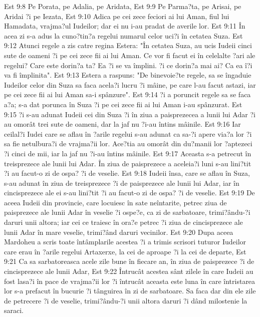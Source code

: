 Est 9:8  Pe Porata, pe Adalia, pe Aridata,
Est 9:9  Pe Parma?ta, pe Arisai, pe Aridai ?i pe Iezata,
Est 9:10  Adica pe cei zece feciori ai lui Aman, fiul lui Hamadata, vrajma?ul Iudeilor; dar ei nu i-au pradat de averile lor.
Est 9:11  În acea zi s-a adus la cuno?tin?a regelui numarul celor uci?i în cetatea Suza.
Est 9:12  Atunci regele a zis catre regina Estera: "În cetatea Suza, au ucis Iudeii cinci sute de oameni ?i pe cei zece fii ai lui Aman. Ce vor fi facut ei în celelalte ?ari ale regelui? Care este dorin?a ta? Ea ?i se va împlini. ?i ce dorin?a mai ai? Ca ea î?i va fi împlinita".
Est 9:13  Estera a raspuns: "De binevoie?te regele, sa se îngaduie Iudeilor celor din Suza sa faca acela?i lucru ?i mâine, pe care l-au facut astazi, iar pe cei zece fii ai lui Aman sa-i spânzure".
Est 9:14  ?i a poruncit regele sa se faca a?a; s-a dat porunca în Suza ?i pe cei zece fii ai lui Aman i-au spânzurat.
Est 9:15  ?i s-au adunat Iudeii cei din Suza ?i în ziua a paisprezecea a lunii lui Adar ?i au omorât trei sute de oameni, dar la jaf nu ?i-au întins mâinile.
Est 9:16  Iar ceilal?i Iudei care se aflau în ?arile regelui s-au adunat ca sa-?i apere via?a lor ?i sa fie netulbura?i de vrajma?ii lor. Ace?tia au omorât din du?manii lor ?aptezeci ?i cinci de mii, iar la jaf nu ?i-au întins mâinile.
Est 9:17  Aceasta s-a petrecut în treisprezece ale lunii lui Adar. În ziua de paisprezece a aceleia?i luni s-au lini?tit ?i au facut-o zi de ospa? ?i de veselie.
Est 9:18  Iudeii însa, care se aflau în Suza, s-au adunat în ziua de treisprezece ?i de paisprezece ale lunii lui Adar, iar în cincisprezece ale ei s-au lini?tit ?i au facut-o zi de ospa? ?i de veselie.
Est 9:19  De aceea Iudeii din provincie, care locuiesc în sate neîntarite, petrec ziua de paisprezece ale lunii Adar în veselie ?i ospe?e, ca zi de sarbatoare, trimi?ându-?i daruri unii altora; iar cei ce traiesc în ora?e petrec ?i ziua de cincisprezece ale lunii Adar în mare veselie, trimi?ând daruri vecinilor.
Est 9:20  Dupa aceea Mardoheu a scris toate întâmplarile acestea ?i a trimis scrisori tuturor Iudeilor care erau în ?arile regelui Artaxerxe, la cei de aproape ?i la cei de departe,
Est 9:21  Ca sa sarbatoreasca acele zile bune în fiecare an, în ziua de paisprezece ?i de cincisprezece ale lunii Adar,
Est 9:22  Întrucât acestea sânt zilele în care Iudeii au fost lasa?i în pace de vrajma?ii lor ?i întrucât aceasta este luna în care întristarea lor s-a prefacut în bucurie ?i tânguirea în zi de sarbatoare. Sa faca dar din ele zile de petrecere ?i de veselie, trimi?ându-?i unii altora daruri ?i dând milostenie la saraci.
